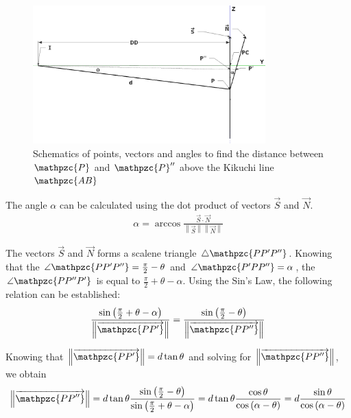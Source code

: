 \documentclass[letterpaper]{article}
\newcommand{\norm}[1]{\left\|#1\right\|}
\newcommand{\var}[1]{\mathpzc{#1}}
\begin{document}
	\begin{figure}
		\centering
		\includegraphics[width=0.8\textwidth]{figures/widthangle2}
		\caption{Schematics of points, vectors and angles to find the distance between $\var{P}$ and $\var{P}^{\prime\prime}$ above the Kikuchi line $\var{AB}$}
		\label{fig:widthangle2}
	\end{figure}
	
	The angle $\alpha$ can be calculated using the dot product of vectors $\vec{S}$ and $\vec{N}$. 
	\begin{eqnarray}
		\alpha = \arccos{\frac{\vec{S}\cdot\vec{N}}{\norm{\vec{S}}\norm{\vec{N}}}}
		\label{eq:alpha}
	\end{eqnarray}
	
	The vectors $\vec{S}$ and $\vec{N}$ forms a scalene triangle $\triangle\var{PP^\prime P^{\prime\prime}}$. 
	Knowing that the $\angle\var{PP^\prime P^{\prime\prime}} = \frac{\pi}{2}-\theta$ and $\angle\var{P^\prime PP^{\prime\prime}} = \alpha$, the $\angle\var{PP^{\prime\prime}P^\prime}$ is equal to $\frac{\pi}{2} + \theta - \alpha$. 
	Using the Sin's Law, the following relation can be established:
	\begin{eqnarray}
		\frac{\sin{\left(\frac{\pi}{2} + \theta - \alpha\right)}}{\norm{\overrightarrow{\var{PP^\prime}}}} = \frac{\sin{\left(\frac{\pi}{2} - \theta\right)}}{\norm{\overrightarrow{\var{PP^{\prime\prime}}}}}
		\label{eq:sinlaw}
	\end{eqnarray}
	
	Knowing that $\norm{\overrightarrow{\var{PP^\prime}}} = d\tan\theta$ and solving for $\norm{\overrightarrow{\var{PP^{\prime\prime}}}}$, we obtain
	\begin{eqnarray}
		\norm{\overrightarrow{\var{PP^{\prime\prime}}}} = d\tan\theta \frac{\sin{\left(\frac{\pi}{2} - \theta\right)}}{\sin{\left(\frac{\pi}{2} + \theta - \alpha\right)}} = d\tan\theta \frac{\cos{\theta}}{\cos{\left(\alpha - \theta\right)}} = d \frac{\sin{\theta}}{\cos{\left(\alpha - \theta\right)}}
		\label{eq:width1}
	\end{eqnarray}
	
\end{document}
